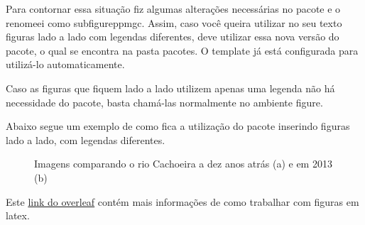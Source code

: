 Para contornar essa situação fiz algumas alterações necessárias no pacote e o renomeei como {\ttfamily subfigureppmgc}. Assim, caso você queira utilizar no seu texto figuras lado a lado com legendas diferentes, deve utilizar essa nova versão do  pacote, o qual se encontra na pasta {\ttfamily pacotes}. O template já está configurada para utilizá-lo automaticamente.

Caso as figuras que fiquem lado a lado  utilizem apenas uma legenda não há necessidade do pacote, basta chamá-las normalmente no ambiente {\ttfamily figure}.

Abaixo segue um exemplo de como fica a utilização do pacote inserindo figuras lado a lado, com legendas diferentes.\\

\begin{figure}[!htb]
\caption{Imagens comparando  o rio Cachoeira a dez anos atrás (a)  e em 2013 (b)} \label{fig:estadorc}\vspace{-0.6cm}
\end{figure}

Este \href{https://www.overleaf.com/learn/latex/Inserting_Images}{link do overleaf} contém mais informações de como trabalhar com figuras em latex. 
